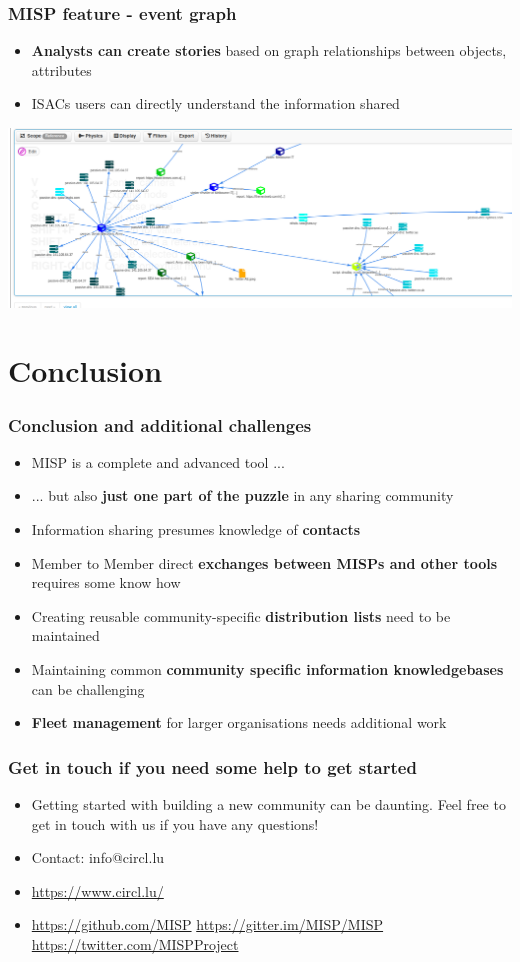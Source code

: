 \begin{frame}
    \frametitle{MISP feature - event graph}
    \begin{itemize}
        \item \textbf{Analysts can create stories} based on graph relationships between objects, attributes
         \item ISACs users can directly understand the information shared
    \end{itemize}
    \includegraphics[scale=0.20]{../images/event-graph.png}
\end{frame}

\section{Conclusion}

\begin{frame}
	\frametitle{Conclusion and additional challenges}
	\begin{itemize}
		\item MISP is a complete and advanced tool ...
		\item ... but also \textbf{just one part of the puzzle} in any sharing community
		\item Information sharing presumes knowledge of \textbf{contacts}
		\item Member to Member direct \textbf{exchanges between MISPs and other tools} requires some know how
		\item Creating reusable community-specific \textbf{distribution lists} need to be maintained
		\item Maintaining common \textbf{community specific information knowledgebases} can be challenging
		\item \textbf{Fleet management} for larger organisations needs additional work
	\end{itemize}
\end{frame}

\begin{frame}
	\frametitle{Get in touch if you need some help to get started}
	\begin{itemize}
		\item Getting started with building a new community can be daunting. Feel free to get in touch with us if you have any questions!
		\item Contact: info@circl.lu
		\item \url{https://www.circl.lu/}
		\item \url{https://github.com/MISP}  \url{https://gitter.im/MISP/MISP}  \url{https://twitter.com/MISPProject}
	\end{itemize}
\end{frame}
